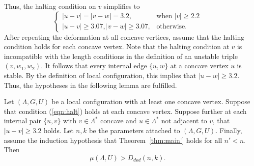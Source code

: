 Thus, the halting condition on $v$ simplifies to 
\begin{equation}\label{eqn:halt}
\begin{cases}
|u-v|=|v-w|=3.2,& \text{when } |v|\ge 2.2\\
|u-v|\ge 3.07, |v-w|\ge 3.07,& \text{otherwise.}
\end{cases}
\end{equation}
After repeating the deformation at all concave vertices, assume that the halting condition
holds for each concave vertex.  Note that the halting
condition at $v$ is incompatible with the length conditions in
the definition of an unstable triple $(v,w_1,w_2)$.  It
follows that every internal edge $\{u,w\}$
at a concave vertex $u$ is stable.  By the definition of local configuration, this
implies that $|u-w|\ge 3.2$.  Thus, the hypotheses in the following lemma are fulfilled.

\begin{lemma}\label{lemma:concave}  
Let $(\Lambda,G,U)$ be a local configuration with at least one
concave vertex.  Suppose that 
condition (\ref{eqn:halt}) holds at each concave vertex.  Suppose further at each internal
pair $\{u,v\}$ with $v\in\Lambda^*$ concave and $u\in\Lambda^*$ not adjacent to $v$,
that $|u-v|\ge 3.2$ holds.   Let $n,k$ be the parameters attached
to $(\Lambda,G,U)$.  Finally, assume the induction hypothesis that Theorem~\ref{thm:main'}
holds for all $n'<n$. Then
   $$\mu(\Lambda,U) > D_{dod}(n,k).$$
\end{lemma}


